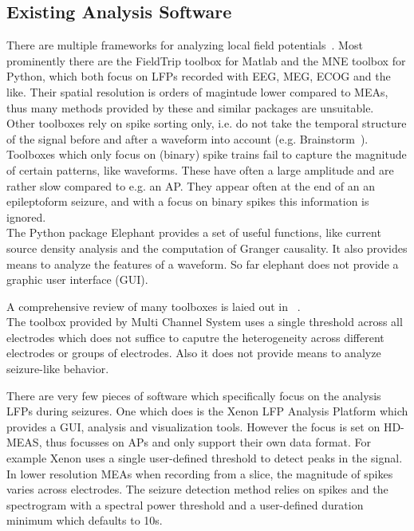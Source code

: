 \documentclass[11pt, twocolumn]{article}
\begin{document}
    \subsection{Existing Analysis Software}
        There are multiple frameworks for analyzing local field potentials~\autocite{unakafova2019comparing}.
        Most prominently there are the FieldTrip toolbox for Matlab and the MNE toolbox for Python, which both focus on LFPs recorded with EEG, MEG, ECOG and the like\autocite{gramfort2014mne, oostenveld2011fieldtrip}.
        Their spatial resolution is orders of magintude lower compared to MEAs, thus many methods provided by these and similar packages are unsuitable. \\
        Other toolboxes rely on spike sorting only, i.e. do not take the temporal structure of the signal before and after a waveform into account (e.g. Brainstorm~\autocite{tadel2011brainstorm}).
        Toolboxes which only focus on (binary) spike trains fail to capture the magnitude of certain patterns, like waveforms.
        These have often a large amplitude and are rather slow compared to e.g. an AP.
        They appear often at the end of an an epileptoform seizure, and with a focus on binary spikes this information is ignored. \\

        The Python package Elephant provides a set of useful functions, like current source density analysis and the computation of Granger causality. It also provides means to analyze the features of a waveform.
        So far elephant does not provide a graphic user interface (GUI).

        A comprehensive review of many toolboxes is laied out in ~\autocite{unakafova2019comparing}. \\

        The toolbox provided by Multi Channel System uses a single threshold across all electrodes which does not suffice to caputre the heterogeneity across different electrodes or groups of electrodes.
        Also it does not provide means to analyze seizure-like behavior.

        There are very few pieces of software which specifically focus on the analysis LFPs during seizures.
        One which does is the Xenon LFP Analysis Platform which provides a GUI, analysis and visualization tools.
        However the focus is set on HD-MEAS, thus focusses on APs and only support their own data format.
        For example Xenon uses a single user-defined threshold to detect peaks in the signal.
        In lower resolution MEAs when recording from a slice, the magnitude of spikes varies across electrodes.
        The seizure detection method relies on spikes and the spectrogram with a spectral power threshold and a user-defined duration minimum which defaults to 10s.
\end{document}
